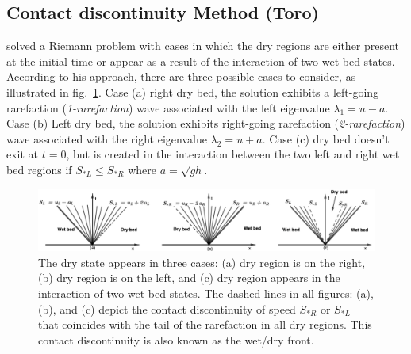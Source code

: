 \documentclass[10pt,a4paper]{article}
\begin{document}
	\subsection{Contact discontinuity  Method (Toro)}
	  \citet{toro2001shock} solved a Riemann problem with cases in which the dry regions are either present at the initial time or appear as a result of the interaction of two wet bed states. According to his approach, there are three possible cases to consider, as illustrated in fig.~\ref{fig:dry-wet}. Case (a) right dry bed, the solution exhibits a left-going rarefaction ({\em 1-rarefaction}) wave associated with the left eigenvalue $\lambda_1 = u - a$. Case (b) Left dry bed, the solution exhibits right-going rarefaction ({\em 2-rarefaction}) wave associated with the right eigenvalue $\lambda_2 = u + a$. Case (c) dry bed doesn't exit at $t=0$, but is created in the interaction between the two left and right wet bed regions if $S_{*L} \le S_{*R}$ where $a = \sqrt{gh}$.
	\begin{figure}[H]
		\centering
		\includegraphics[width=.9\linewidth]{images/dry-wet}
		\caption{The dry state appears in three cases: (a) dry region is on the right, (b) dry region is on the left, and (c) dry region appears in the interaction of two wet bed states. The dashed lines in all figures: (a), (b), and (c) depict the contact discontinuity of speed $S_{*R}$ or $S_{*L}$ that coincides with the tail of the rarefaction in all dry regions. This contact discontinuity is also known as the wet/dry front.}
		\label{fig:dry-wet}
	\end{figure}
	
	
	
\end{document}
